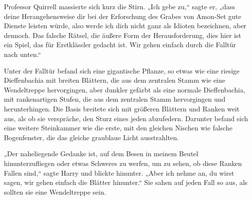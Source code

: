 Professor Quirrell massierte sich kurz die Stirn.
„Ich gebe zu,“ sagte er, „dass deine Herangehensweise dir bei der Erforschung des Grabes von Amon-Set gute Dienste leisten würde, also werde ich dich nicht ganz als Idioten bezeichnen, aber dennoch. Das falsche Rätsel, die äußere Form der Herausforderung, dies hier ist ein Spiel, das für Erstklässler gedacht ist. Wir gehen einfach durch die Falltür nach unten.“

Unter der Falltür befand sich eine gigantische Pflanze, so etwas wie eine riesige Dieffenbachia mit breiten Blättern, die aus dem zentralen Stamm wie eine Wendeltreppe hervorgingen, aber dunkler gefärbt als eine normale Dieffenbachia, mit rankenartigen Stufen, die aus dem zentralen Stamm hervorgingen und herunterhingen. Die Basis breitete sich mit größeren Blättern und Ranken weit aus, als ob sie verspräche, den Sturz eines jeden abzufedern. Darunter befand sich eine weitere Steinkammer wie die erste, mit den gleichen Nischen wie falsche Bogenfenster, die das gleiche graublaue Licht ausstrahlten.

„Der naheliegende Gedanke ist, auf dem Besen in meinem Beutel hinunterzufliegen oder etwas Schweres zu werfen, um zu sehen, ob diese Ranken Fallen sind,“ sagte Harry und blickte hinunter. „Aber ich nehme an, du wirst sagen, wir gehen einfach die Blätter hinunter.“
Sie sahen auf jeden Fall so aus, als sollten sie eine Wendeltreppe sein.

